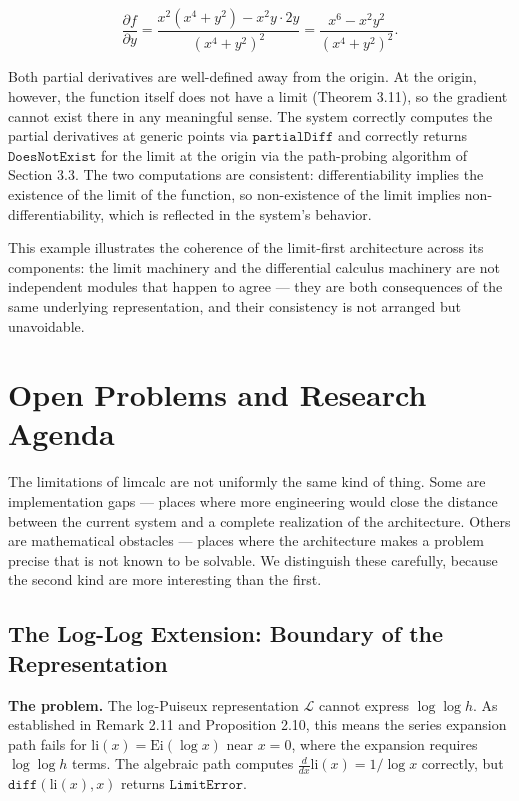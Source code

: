 \documentclass[12pt]{article}
\begin{document}
\[\frac{\partial f}{\partial y} = \frac{x^2(x^4+y^2) - x^2y \cdot 2y}{(x^4+y^2)^2} = \frac{x^6 - x^2y^2}{(x^4+y^2)^2}.\]

Both partial derivatives are well-defined away from the origin. At the
origin, however, the function itself does not have a limit (Theorem
3.11), so the gradient cannot exist there in any meaningful sense. The
system correctly computes the partial derivatives at generic points via
\(\mathtt{partialDiff}\) and correctly returns \(\mathtt{DoesNotExist}\)
for the limit at the origin via the path-probing algorithm of Section
3.3. The two computations are consistent: differentiability implies the
existence of the limit of the function, so non-existence of the limit
implies non-differentiability, which is reflected in the system's
behavior.

This example illustrates the coherence of the limit-first architecture
across its components: the limit machinery and the differential calculus
machinery are not independent modules that happen to agree --- they are
both consequences of the same underlying representation, and their
consistency is not arranged but unavoidable.




\section{Open Problems and Research
Agenda}\label{open-problems-and-research-agenda}

The limitations of limcalc are not uniformly the same kind of thing.
Some are implementation gaps --- places where more engineering would
close the distance between the current system and a complete realization
of the architecture. Others are mathematical obstacles --- places where
the architecture makes a problem precise that is not known to be
solvable. We distinguish these carefully, because the second kind are
more interesting than the first.




\subsection{The Log-Log Extension: Boundary of the
Representation}\label{the-log-log-extension-boundary-of-the-representation}

\textbf{The problem.} The log-Puiseux representation \(\mathcal{L}\)
cannot express \(\log \log h\). As established in Remark 2.11 and
Proposition 2.10, this means the series expansion path fails for
\(\mathrm{li}(x) = \mathrm{Ei}(\log x)\) near \(x = 0\), where the
expansion requires \(\log \log h\) terms. The algebraic path computes
\(\frac{d}{dx}\mathrm{li}(x) = 1/\log x\) correctly, but
\(\mathtt{diff}(\mathrm{li}(x), x)\) returns \(\mathtt{LimitError}\).
\end{document}
